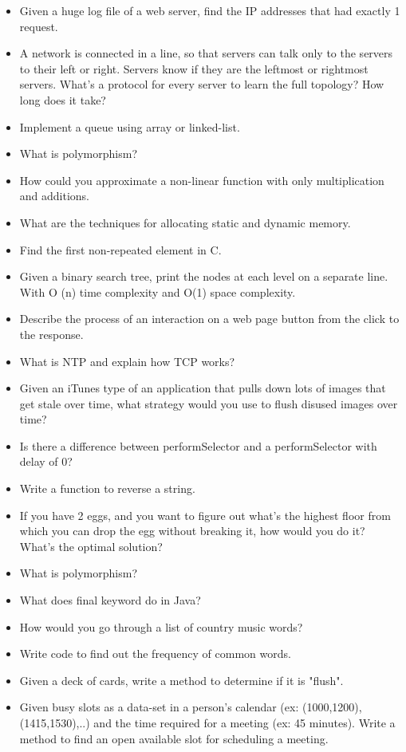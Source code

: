 \documentclass{article}
\begin{document}
\begin{itemize}
	\item Given a huge log file of a web server, find the IP addresses that had exactly 1 request.
	\item A network is connected in a line, so that servers can talk only to the servers to their left or right. Servers know if they are the leftmost or rightmost servers. What's a protocol for every server to learn the full topology? How long does it take?
	\item Implement a queue using array or linked-list.
	\item What is polymorphism?
	\item How could you approximate a non-linear function with only multiplication and additions. 
	\item What are the techniques for allocating static and dynamic memory.
	\item Find the first non-repeated element in C.
	\item Given a binary search tree, print the nodes at each level on a separate line. With O (n) time complexity and O(1) space complexity.
	\item Describe the process of an interaction on a web page button from the click to the response.
	\item What is NTP and explain how TCP works?
	\item Given an iTunes type of an application that pulls down lots of images that get stale over time, what strategy would you use to flush disused images over time?
	\item Is there a difference between performSelector and a performSelector with delay of 0?
	\item Write a function to reverse a string.
	\item If you have 2 eggs, and you want to figure out what's the highest floor from which you can drop the egg without breaking it, how would you do it? What's the optimal solution?
	\item What is polymorphism?
	\item What does final keyword do in Java?
	\item How would you go through a list of country music words?
	\item Write code to find out the frequency of common words.
	\item Given a deck of cards, write a method to determine if it is "flush".
	\item Given busy slots as a data-set in a person's calendar (ex: {(1000,1200),(1415,1530),..}) and the time required for a meeting (ex: 45 minutes). Write a method to find an open available slot for scheduling a meeting.

\end{itemize}
\end{document}
